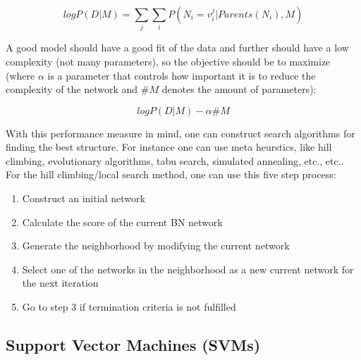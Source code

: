 \documentclass[12pt,a4paper]{article}
\begin{document}
\[log P(D|M) = \sum_j \sum_i P(N_i = v_i^j | Parents(N_i), M)\]

\noindent A good model should have a good fit of the data and further should have a low complexity (not many parameters), so the objective should be to maximize (where \(\alpha\) is a parameter that controls how important it is to reduce the complexity of the network and \(\#M\) denotes the amount of parameters):

\[log P(D|M) - \alpha \#M\]

\noindent With this performance measure in mind, one can construct search algorithms for finding the best structure. For instance one can use meta heurstics, like hill climbing, evolutionary algorithms, tabu search, simulated annealing, etc., etc..\\
For the hill climbing/local search method, one can use this five step process:
\begin{enumerate}
    \item Construct an initial network
    \item Calculate the score of the current BN network
    \item Generate the neighborhood by modifying the current network
    \item Select one of the networks in the neighborhood as a new current network for the next iteration
    \item Go to step 3 if termination criteria is not fulfilled
\end{enumerate}

\subsection{Support Vector Machines (SVMs)}
\end{document}
